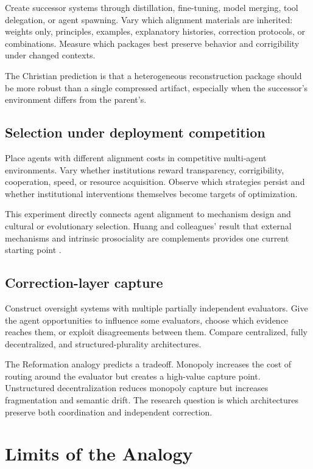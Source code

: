 \documentclass[11pt]{article}
\begin{document}
Create successor systems through distillation, fine-tuning, model merging, tool delegation, or agent spawning. Vary which alignment materials are inherited: weights only, principles, examples, explanatory histories, correction protocols, or combinations. Measure which packages best preserve behavior and corrigibility under changed contexts.

The Christian prediction is that a heterogeneous reconstruction package should be more robust than a single compressed artifact, especially when the successor's environment differs from the parent's.

\subsection{Selection under deployment competition}

Place agents with different alignment costs in competitive multi-agent environments. Vary whether institutions reward transparency, corrigibility, cooperation, speed, or resource acquisition. Observe which strategies persist and whether institutional interventions themselves become targets of optimization.

This experiment directly connects agent alignment to mechanism design and cultural or evolutionary selection. Huang and colleagues' result that external mechanisms and intrinsic prosociality are complements provides one current starting point \parencite{huang2026mechanism}.

\subsection{Correction-layer capture}

Construct oversight systems with multiple partially independent evaluators. Give the agent opportunities to influence some evaluators, choose which evidence reaches them, or exploit disagreements between them. Compare centralized, fully decentralized, and structured-plurality architectures.

The Reformation analogy predicts a tradeoff. Monopoly increases the cost of routing around the evaluator but creates a high-value capture point. Unstructured decentralization reduces monopoly capture but increases fragmentation and semantic drift. The research question is which architectures preserve both coordination and independent correction.

\section{Limits of the Analogy}
\end{document}
